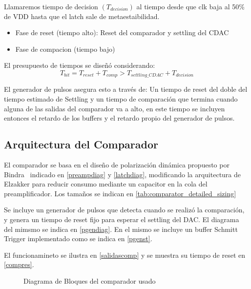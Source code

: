 \documentclass[12pt,a4paper]{report}
\begin{document}
Llamaremos tiempo de decision $(T_{decision})$ al tiempo desde que clk baja al 50\% de VDD hasta que el latch sale de metaestaibilidad.

\begin{itemize}
    \item Fase de reset (tiempo alto): Reset del comparador y settling del CDAC
    \item Fase de compacion (tiempo bajo)
\end{itemize}

El presupuesto de tiempos se diseñó considerando:
\begin{equation}
T_{bit} = T_{reset} + T_{comp} > T_{settling\_CDAC} + T_{decision}
\end{equation}

El generador de pulsos asegura esto a través de:
Un tiempo de reset del doble del tiempo estimado de Settling y un tiempo de comparación que termina cuando alguna de las salidas del comparador va a alto, en este tiempo se incluyen entonces el retardo de los buffers y el retardo propio del generador de pulsos.

\subsection{Arquitectura del Comparador}

El comparador se basa en el diseño de polarización dinámica propuesto por Bindra~\cite{bindra_comparator} indicado en \cref{preampdiag} y \cref{latchdiag}, modificando la arquitectura de Elzakker\cite{vanelzakker_sar} para reducir consumo mediante un capacitor en la cola del preamplificador. Los tamaños se indican en \cref{tab:comparator_detailed_sizing}

Se incluye un generador de pulsos que detecta cuando se realizó la comparación, y genera un tiempo de reset fijo para esperar el settling del DAC. El diagrama del mimsmo se indica en \cref{pgendiag}. En el mismo se incluye un buffer Schmitt Trigger implementado como se indica en \cref{pgenst}.

El funcionamineto se ilustra en \cref{salidascomp} y se muestra su tiempo de reset en \cref{compres}.

\begin{figure}[H]
    \centering
    
    \caption{Diagrama de Bloques del comparador usado}
        \label{compbloques}
\end{figure}
\end{document}
